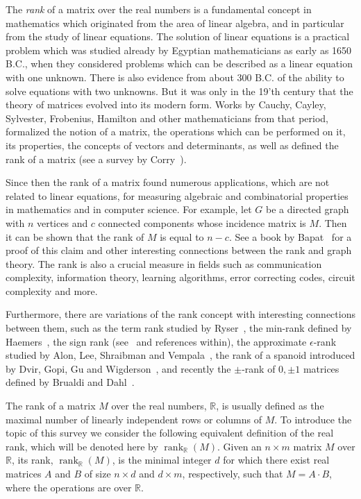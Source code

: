 \documentclass[11pt]{article}
\def\R{\mathbb{R}}
\newcommand{\rank}{\mathop{\mathrm{rank}}}
\newcommand{\Rreal}{{\rank}_\mathbb{R}}
\begin{document}
The {\em rank} of a matrix over the real numbers is a fundamental concept in mathematics which originated from the area of linear algebra, and in particular from the study of linear equations.
The solution of linear equations is a practical problem which was studied already by Egyptian mathematicians as early as 1650 B.C.,
when they considered problems which can be described as a linear equation with one unknown.
There is also evidence from about 300 B.C. of the ability to solve equations with two unknowns.
But it was only in the 19'th century that the theory of matrices evolved into its modern form.
Works by Cauchy, Cayley, Sylvester, Frobenius, Hamilton and other mathematicians from that period, formalized the notion of a matrix, the operations which can be performed on it,
its properties, the concepts of vectors and determinants, as well as defined the rank of a matrix (see a survey by Corry~\cite{Corry}).

Since then the rank of a matrix found numerous applications, which are not related to linear equations, for measuring algebraic and combinatorial properties in mathematics and in computer science.
For example, let $G$ be a directed graph with $n$ vertices and $c$ connected components whose incidence matrix is $M$. Then it can be shown that the rank of $M$ is equal to $n-c$.
See a book by Bapat~\cite{bapat2010graphs} for a proof of  this claim and other interesting connections between the rank and graph theory.
The rank is also a crucial measure in fields such as communication complexity, information theory, learning algorithms,  error correcting codes, circuit complexity and more.

Furthermore, there are variations of the rank concept with interesting connections between them,
such as the term rank studied by Ryser~\cite{ryser1958term}, the min-rank defined by Haemers~\cite{haemers1979some},
the sign rank (see~\cite{razborov2010sign} and references within), the approximate $\epsilon$-rank studied by Alon, Lee, Shraibman and Vempala~\cite{alon2013approximate},
the rank of a spanoid introduced by  Dvir, Gopi, Gu and Wigderson~\cite{ dvir2020spanoids},
and recently the $\pm$-rank of $0,\pm 1$ matrices defined by Brualdi and Dahl~\cite{BRUALDI2026318}.

The rank of a matrix $M$ over the real numbers, $\R$, is usually defined as the maximal number of linearly independent rows or columns of $M$.
To introduce the topic of this survey we consider the following equivalent definition of the real rank, which will be denoted here by $\Rreal(M)$.
Given an $n\times m$ matrix $M$ over $\R$, its rank, $\Rreal(M)$, is the minimal integer $d$ for which there exist real matrices $A$ and $B$ of size $n \times d$ and $d \times m$,
respectively, such that $M = A \cdot B$, where the operations are over $\R$.
\end{document}

